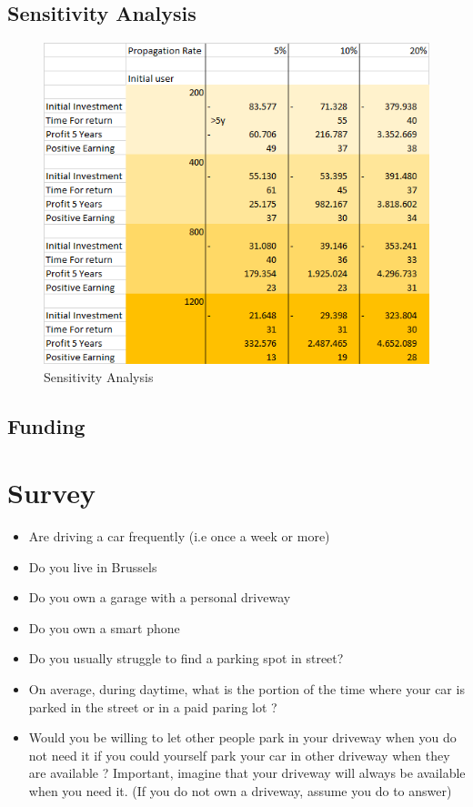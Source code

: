 \documentclass[12pt,a4paper,oneside]{book}
\begin{document}
\section{Sensitivity Analysis}

\begin{figure}[h]
\centering
\caption{Sensitivity Analysis}
\label{eey13}
\includegraphics[keepaspectratio=true,width=\textwidth-2cm]{../images/sensitivity.png}
\end{figure}

\section{Funding}


\appendix

\chapter{Survey}
\begin{itemize}
\item Are driving a car frequently (i.e once a week or more)
\item Do you live in Brussels
\item Do you own a garage with a personal driveway
\item Do you own a smart phone
\item Do you usually struggle to find a parking spot in street?
\item On average, during daytime, what is the portion of the time where your car is parked in the street or in a paid paring lot ?
\item Would you be willing to let other people park in your driveway when you do not need it if you could yourself park your car in other driveway when they are available ? Important, imagine that your driveway will always be available when you need it. (If you do not own a driveway, assume you do to answer)
\end{itemize}
\end{document}
